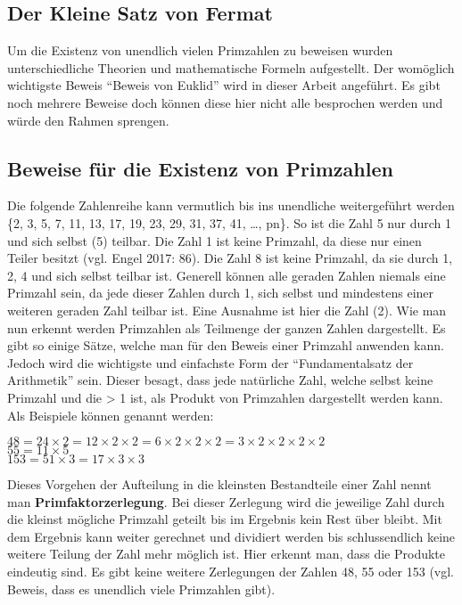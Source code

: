 \documentclass[german,12pt,a4paper]{article}
\begin{document}
\subsection{Der Kleine Satz von Fermat}\label{Der Kleine Satz von Fermat}


Um die Existenz von unendlich vielen Primzahlen zu beweisen wurden unterschiedliche Theorien und mathematische Formeln aufgestellt. Der womöglich wichtigste Beweis “Beweis von Euklid” wird in dieser Arbeit angeführt. Es gibt noch mehrere Beweise doch können diese hier nicht alle besprochen werden und würde den Rahmen sprengen.

\subsection{Beweise für die Existenz von Primzahlen}
Die folgende Zahlenreihe kann vermutlich bis ins unendliche weitergeführt werden \{2, 3, 5, 7, 11, 13, 17, 19, 23, 29, 31, 37, 41, …, pn\}. So ist die Zahl 5 nur durch 1 und sich selbst (5) teilbar. Die Zahl 1 ist keine Primzahl, da diese nur einen Teiler besitzt (vgl. Engel 2017: 86). Die Zahl 8 ist keine Primzahl, da sie durch 1, 2, 4 und sich selbst teilbar ist. Generell können alle geraden Zahlen niemals eine Primzahl sein, da jede dieser Zahlen durch 1, sich selbst und mindestens einer weiteren geraden Zahl teilbar ist. Eine Ausnahme ist hier die Zahl (2). Wie man nun erkennt werden Primzahlen als Teilmenge der ganzen Zahlen dargestellt. Es gibt so einige Sätze, welche man für den Beweis einer Primzahl anwenden kann. Jedoch wird die wichtigste und einfachste Form der “Fundamentalsatz der Arithmetik” sein. Dieser besagt, dass jede natürliche Zahl, welche selbst keine Primzahl und die > 1 ist, als Produkt von Primzahlen dargestellt werden kann. Als Beispiele können genannt werden:\
\begin{center}$48 = 24\times{2} = 12\times{2}\times{2} = 6\times{2}\times{2}\times{2} = 3\times{2}\times{2}\times{2}\times{2}$\\
$55 = 11\times5$\\
$153 = 51\times{3} = 17\times{3}\times{3}$\end{center}
Dieses Vorgehen der Aufteilung in die kleinsten Bestandteile einer Zahl nennt man \textbf{Primfaktorzerlegung}. Bei dieser Zerlegung wird die jeweilige Zahl durch die kleinst mögliche Primzahl geteilt bis im Ergebnis kein Rest über bleibt. Mit dem Ergebnis kann weiter gerechnet und dividiert werden bis schlussendlich keine weitere Teilung der Zahl mehr möglich ist. Hier erkennt man, dass die Produkte eindeutig sind. Es gibt keine weitere Zerlegungen der Zahlen 48, 55 oder 153 (vgl. Beweis, dass es unendlich viele Primzahlen gibt). 
\end{document}
